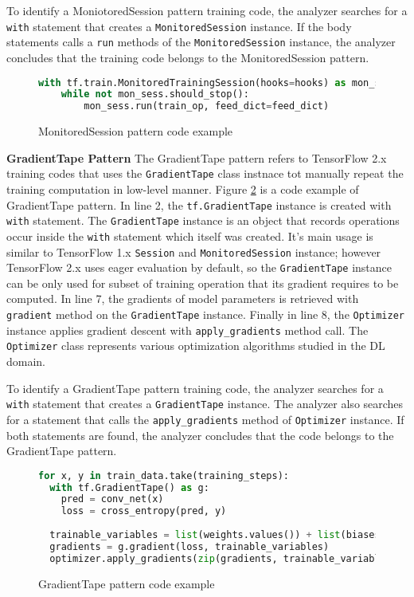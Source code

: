 To identify a MoniotoredSession pattern training code,
the analyzer searches for a {\tt with} statement that creates a
{\tt MonitoredSession} instance.
If the body statements calls a {\tt run} methods of the {\tt MonitoredSession}
instance, the analyzer concludes that the training code belongs to the
MonitoredSession pattern.

\begin{figure}[!ht]
  \begin{lstlisting}[language=Python]
with tf.train.MonitoredTrainingSession(hooks=hooks) as mon_sess:
    while not mon_sess.should_stop():
        mon_sess.run(train_op, feed_dict=feed_dict)
  \end{lstlisting}
  \label{fig:monsesspattern}
  \caption{MonitoredSession pattern code example}
\end{figure}


\textbf{GradientTape Pattern}
The GradientTape pattern refers to TensorFlow 2.x training codes that
uses the {\tt GradientTape} class instnace tot manually repeat the 
training computation in low-level manner.
Figure \ref{fig:tapepattern} is a code example of GradientTape pattern.
In line 2, the {\tt tf.GradientTape} instance is created with
{\tt with} statement.
The {\tt GradientTape} instance is an object that records operations
occur inside the {\tt with} statement which itself was created. 
It's main usage is similar to TensorFlow 1.x {\tt Session} and
{\tt MonitoredSession} instance; however TensorFlow 2.x uses eager evaluation
by default, so the {\tt GradientTape} instance can be only used for
subset of training operation that its gradient requires to be computed.
In line 7, the gradients of model parameters is retrieved with
{\tt gradient} method on the {\tt GradientTape} instance.
Finally in line 8, the {\tt Optimizer} instance applies gradient descent with
{\tt apply\_gradients} method call.
The {\tt Optimizer} class represents various optimization algorithms studied in 
the DL domain.

To identify a GradientTape pattern training code,
the analyzer searches for a {\tt with} statement that creates a
{\tt GradientTape} instance.
The analyzer also searches for a statement that calls the {\tt apply\_gradients}
method of {\tt Optimizer} instance.
If both statements are found, the analyzer concludes that the code
belongs to the GradientTape pattern.

\begin{figure}[!ht]
  \begin{lstlisting}[language=Python]
for x, y in train_data.take(training_steps):
  with tf.GradientTape() as g:
    pred = conv_net(x)
    loss = cross_entropy(pred, y)
    
  trainable_variables = list(weights.values()) + list(biases.values())
  gradients = g.gradient(loss, trainable_variables)
  optimizer.apply_gradients(zip(gradients, trainable_variables))
  \end{lstlisting}
  \label{fig:tapepattern}
  \caption{GradientTape pattern code example}
\end{figure}


